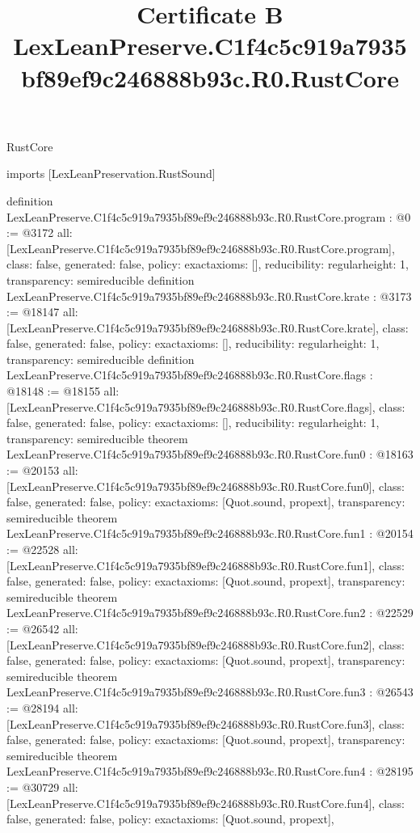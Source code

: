 \begin{lexlean}{RustCore}
\title{Certificate B LexLeanPreserve.C1f4c5c919a7935bf89ef9c246888b93c.R0.RustCore}
\begin{coremodule}
imports [LexLeanPreservation.RustSound]

definition LexLeanPreserve.C1f4c5c919a7935bf89ef9c246888b93c.R0.RustCore.program : @0 := @3172 {
  all: [LexLeanPreserve.C1f4c5c919a7935bf89ef9c246888b93c.R0.RustCore.program],
  class: false,
  generated: false,
  policy: exact{axioms: []},
  reducibility: regular{height: 1},
  transparency: semireducible
}
definition LexLeanPreserve.C1f4c5c919a7935bf89ef9c246888b93c.R0.RustCore.krate : @3173 := @18147 {
  all: [LexLeanPreserve.C1f4c5c919a7935bf89ef9c246888b93c.R0.RustCore.krate],
  class: false,
  generated: false,
  policy: exact{axioms: []},
  reducibility: regular{height: 1},
  transparency: semireducible
}
definition LexLeanPreserve.C1f4c5c919a7935bf89ef9c246888b93c.R0.RustCore.flags : @18148 := @18155 {
  all: [LexLeanPreserve.C1f4c5c919a7935bf89ef9c246888b93c.R0.RustCore.flags],
  class: false,
  generated: false,
  policy: exact{axioms: []},
  reducibility: regular{height: 1},
  transparency: semireducible
}
theorem LexLeanPreserve.C1f4c5c919a7935bf89ef9c246888b93c.R0.RustCore.fun0 : @18163 := @20153 {
  all: [LexLeanPreserve.C1f4c5c919a7935bf89ef9c246888b93c.R0.RustCore.fun0],
  class: false,
  generated: false,
  policy: exact{axioms: [Quot.sound, propext]},
  transparency: semireducible
}
theorem LexLeanPreserve.C1f4c5c919a7935bf89ef9c246888b93c.R0.RustCore.fun1 : @20154 := @22528 {
  all: [LexLeanPreserve.C1f4c5c919a7935bf89ef9c246888b93c.R0.RustCore.fun1],
  class: false,
  generated: false,
  policy: exact{axioms: [Quot.sound, propext]},
  transparency: semireducible
}
theorem LexLeanPreserve.C1f4c5c919a7935bf89ef9c246888b93c.R0.RustCore.fun2 : @22529 := @26542 {
  all: [LexLeanPreserve.C1f4c5c919a7935bf89ef9c246888b93c.R0.RustCore.fun2],
  class: false,
  generated: false,
  policy: exact{axioms: [Quot.sound, propext]},
  transparency: semireducible
}
theorem LexLeanPreserve.C1f4c5c919a7935bf89ef9c246888b93c.R0.RustCore.fun3 : @26543 := @28194 {
  all: [LexLeanPreserve.C1f4c5c919a7935bf89ef9c246888b93c.R0.RustCore.fun3],
  class: false,
  generated: false,
  policy: exact{axioms: [Quot.sound, propext]},
  transparency: semireducible
}
theorem LexLeanPreserve.C1f4c5c919a7935bf89ef9c246888b93c.R0.RustCore.fun4 : @28195 := @30729 {
  all: [LexLeanPreserve.C1f4c5c919a7935bf89ef9c246888b93c.R0.RustCore.fun4],
  class: false,
  generated: false,
  policy: exact{axioms: [Quot.sound, propext]},
}
\end{coremodule}
\end{lexlean}
